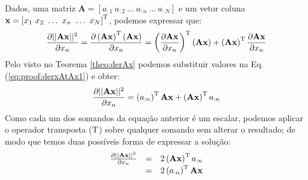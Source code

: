\begin{myproofT}\label{proof:theo:derxAtAx}
Dados,
uma matriz $\mathbf{A}=\left[a_{:1}~ a_{:2}~ \hdots~ a_{:n}~ \hdots~ a_{:N}\right]$ e 
um vetor coluna $\mathbf{x}=\left[x_{1}~ x_{2}~ \hdots~ x_{n}~ \hdots~ x_{N}\right]^{\mathrm{T}}$, 
podemos expressar que:
\begin{equation}\label{eq:proof:derxAtAx1}
\frac{\partial ||\mathbf{A}\mathbf{x}||^{2}}{\partial x_n}=
\frac{\partial \left(\mathbf{A}\mathbf{x}\right)^{\mathrm{T}}\left(\mathbf{A}\mathbf{x}\right)}{\partial x_n}=
\left(\frac{\partial \mathbf{A}\mathbf{x}}{\partial x_n}\right)^{\mathrm{T}}\left(\mathbf{A}\mathbf{x}\right)+
\left(\mathbf{A}\mathbf{x}\right)^{\mathrm{T}} \frac{\partial \mathbf{A}\mathbf{x}}{\partial x_n}
\end{equation}
Pelo visto no Teorema \ref{theo:derAx} podemos substituir valores na Eq. (\ref{eq:proof:derxAtAx1})
e obter:
\begin{equation}\label{eq:proof:derxAtAx2}
\frac{\partial ||\mathbf{A}\mathbf{x}||^{2}}{\partial x_n}=
\left(a_{:n}\right)^{\mathrm{T}} \mathbf{A}\mathbf{x} +
\left(\mathbf{A}\mathbf{x}\right)^{\mathrm{T}} a_{:n}
\end{equation}
Como cada um dos somandos da equação anterior é um escalar, podemos aplicar o operador
transposta ($\mathrm{T}$) sobre qualquer somando sem alterar o resultado; de modo que temos duas possíveis
forma de expressar a solução:
\begin{equation}
\begin{matrix}
\frac{\partial ||\mathbf{A}\mathbf{x}||^2 }{\partial x_n}&=&
2\left(\mathbf{A}\mathbf{x}\right)^{\mathrm{T}}a_{:n}\\
~&=& 2\left(a_{:n}\right)^{\mathrm{T}}\mathbf{A}\mathbf{x}
\end{matrix}
\end{equation}
\end{myproofT}


